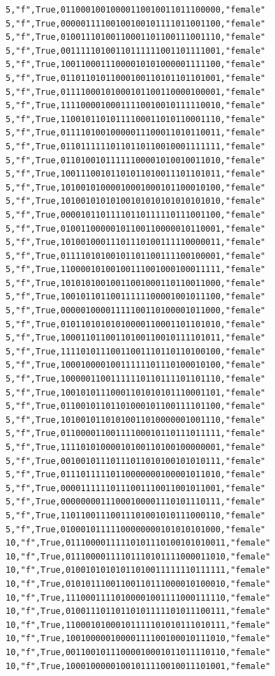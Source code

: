\documentclass[authoryearcitations]{UoYCSproject}
\begin{document}
\begin{framed}
\begin{verbatim}
5,"f",True,01100010010000110010011011100000,"female"
5,"f",True,00000111100100100101111011001100,"female"
5,"f",True,01001110100110001101100111001110,"female"
5,"f",True,00111110100110111111001101111001,"female"
5,"f",True,10011000111000010101000001111100,"female"
5,"f",True,01101101011000100110101101101001,"female"
5,"f",True,01111000101000101100110000100001,"female"
5,"f",True,11110000100011110010010111110010,"female"
5,"f",True,11001011010111100011010110001110,"female"
5,"f",True,01111010010000011100011010110011,"female"
5,"f",True,01101111110110110110010001111111,"female"
5,"f",True,01101001011111100001010010011010,"female"
5,"f",True,10011100101101011010011101101011,"female"
5,"f",True,10100101000010001000101100010100,"female"
5,"f",True,10100101010100101010101010101010,"female"
5,"f",True,00001011011110110111110111001100,"female"
5,"f",True,01001100000101100110000010110001,"female"
5,"f",True,10100100011101110100111110000011,"female"
5,"f",True,01111010100101101100111100100001,"female"
5,"f",True,11000010100100111001000100011111,"female"
5,"f",True,10101010010011001000110110011000,"female"
5,"f",True,10010110110011111100001001011100,"female"
5,"f",True,00000100001111100110100001011000,"female"
5,"f",True,01011010101010000110001101101010,"female"
5,"f",True,10001101100110100110010111101011,"female"
5,"f",True,11110101110011001110110110100100,"female"
5,"f",True,10001000010011111101110100010100,"female"
5,"f",True,10000011001111110110111101101110,"female"
5,"f",True,10010101110001101010101110001101,"female"
5,"f",True,01100101101101000101100111101100,"female"
5,"f",True,10100101101010011010000001001110,"female"
5,"f",True,01100001100111100010110111011111,"female"
5,"f",True,11110101000010100110100100000001,"female"
5,"f",True,00100101110111011010100101010111,"female"
5,"f",True,01110111110110000000100001011010,"female"
5,"f",True,00001111110111001110011001011001,"female"
5,"f",True,00000000111000100001110101110111,"female"
5,"f",True,11011001110011101001010111000110,"female"
5,"f",True,01000101111100000000101010101000,"female"
10,"f",True,01110000111110101110100101010011,"female"
10,"f",True,01110000111101110101111000011010,"female"
10,"f",True,01001010101011010011111110111111,"female"
10,"f",True,01010111001100110111000010100010,"female"
10,"f",True,11100011110100001001111000111110,"female"
10,"f",True,01001110110110101111101011100111,"female"
10,"f",True,11000101000101111101010111010111,"female"
10,"f",True,10010000010000111100100010111010,"female"
10,"f",True,00110010111000010001011011110110,"female"
10,"f",True,10001000001001011110010011101001,"female"

\end{verbatim}
\end{framed}
\end{document}
